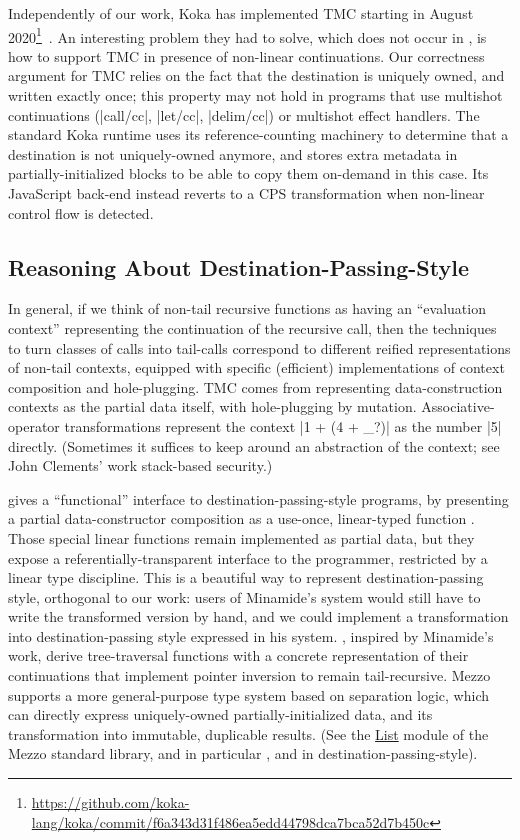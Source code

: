Independently of our work, Koka has implemented TMC starting in August
2020\footnote{\url{https://github.com/koka-lang/koka/commit/f6a343d31f486ea5edd44798dca7bca52d7b450c}}~\citep*{tmc-koka-2023}.
An interesting problem they had to solve, which does not occur in \OCaml,
is how to support TMC in presence of non-linear continuations. Our
correctness argument for TMC relies on the fact that the destination
is uniquely owned, and written exactly once; this property may not
hold in programs that use multishot continuations (\ocaml|call/cc|,
\ocaml|let/cc|, \ocaml|delim/cc|) or multishot effect handlers. The standard Koka runtime uses its
reference-counting machinery to determine that a destination is not
uniquely-owned anymore, and stores extra metadata in
partially-initialized blocks to be able to copy them on-demand in this
case. Its JavaScript back-end instead reverts to a CPS transformation
when non-linear control flow is detected.

\subsection{Reasoning About Destination-Passing-Style}

In general, if we think of non-tail recursive functions as having an ``evaluation context'' representing the continuation of the recursive call, then the techniques to turn classes of calls into tail-calls correspond to different reified representations of non-tail contexts, equipped with specific (efficient) implementations of context composition and hole-plugging.
TMC comes from representing data-construction contexts as the partial data itself, with hole-plugging by mutation.
Associative-operator transformations represent the context \ocaml|1 + (4 + _?)| as the number \ocaml|5| directly.
(Sometimes it suffices to keep around an abstraction of the context; see John Clements' work stack-based security.)

\citet*{minamide-98} gives a ``functional'' interface to destination-passing-style programs, by presenting a partial data-constructor composition  as a use-once, linear-typed function .
Those special linear functions remain implemented as partial data, but they expose a referentially-transparent interface to the programmer, restricted by a linear type discipline.
This is a beautiful way to represent destination-passing style, orthogonal to our work: users of Minamide's system would still have to write the transformed version by hand, and we could implement a transformation into destination-passing style expressed in his system.
\citet*{sobel-friedman-98}, inspired by Minamide's work, derive tree-traversal functions with a concrete representation of their continuations that implement pointer inversion to remain tail-recursive.
Mezzo~\citep*{mezzo-2016} supports a more general-purpose type system based on separation logic, which can directly express uniquely-owned partially-initialized data, and its transformation into immutable, duplicable results.
(See the \href{https://protz.github.io/mezzo/code_samples/list.mz.html}{List} module of the Mezzo standard library, and in particular ,  and  in destination-passing-style).

